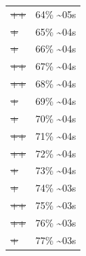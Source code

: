 \documentclass[12pt]{article}
\begin{document}
\begin{center}
\begin{tabular}{ll}
\sout{\sout{\sout{\sout{\sout{\sout{\sout{\sout{\sout{\sout{\sout{\sout{\sout{\sout{\sout{++}}}}}}}}}}}}}}} & 64\% \textasciitilde{}05s\\
\sout{\sout{\sout{\sout{\sout{\sout{\sout{\sout{\sout{\sout{\sout{\sout{\sout{\sout{\sout{\sout{+}}}}}}}}}}}}}}}} & 65\% \textasciitilde{}04s\\
\sout{\sout{\sout{\sout{\sout{\sout{\sout{\sout{\sout{\sout{\sout{\sout{\sout{\sout{\sout{\sout{+}}}}}}}}}}}}}}}} & 66\% \textasciitilde{}04s\\
\sout{\sout{\sout{\sout{\sout{\sout{\sout{\sout{\sout{\sout{\sout{\sout{\sout{\sout{\sout{\sout{++}}}}}}}}}}}}}}}} & 67\% \textasciitilde{}04s\\
\sout{\sout{\sout{\sout{\sout{\sout{\sout{\sout{\sout{\sout{\sout{\sout{\sout{\sout{\sout{\sout{++}}}}}}}}}}}}}}}} & 68\% \textasciitilde{}04s\\
\sout{\sout{\sout{\sout{\sout{\sout{\sout{\sout{\sout{\sout{\sout{\sout{\sout{\sout{\sout{\sout{\sout{+}}}}}}}}}}}}}}}}} & 69\% \textasciitilde{}04s\\
\sout{\sout{\sout{\sout{\sout{\sout{\sout{\sout{\sout{\sout{\sout{\sout{\sout{\sout{\sout{\sout{\sout{+}}}}}}}}}}}}}}}}} & 70\% \textasciitilde{}04s\\
\sout{\sout{\sout{\sout{\sout{\sout{\sout{\sout{\sout{\sout{\sout{\sout{\sout{\sout{\sout{\sout{\sout{++}}}}}}}}}}}}}}}}} & 71\% \textasciitilde{}04s\\
\sout{\sout{\sout{\sout{\sout{\sout{\sout{\sout{\sout{\sout{\sout{\sout{\sout{\sout{\sout{\sout{\sout{++}}}}}}}}}}}}}}}}} & 72\% \textasciitilde{}04s\\
\sout{\sout{\sout{\sout{\sout{\sout{\sout{\sout{\sout{\sout{\sout{\sout{\sout{\sout{\sout{\sout{\sout{\sout{+}}}}}}}}}}}}}}}}}} & 73\% \textasciitilde{}04s\\
\sout{\sout{\sout{\sout{\sout{\sout{\sout{\sout{\sout{\sout{\sout{\sout{\sout{\sout{\sout{\sout{\sout{\sout{+}}}}}}}}}}}}}}}}}} & 74\% \textasciitilde{}03s\\
\sout{\sout{\sout{\sout{\sout{\sout{\sout{\sout{\sout{\sout{\sout{\sout{\sout{\sout{\sout{\sout{\sout{\sout{++}}}}}}}}}}}}}}}}}} & 75\% \textasciitilde{}03s\\
\sout{\sout{\sout{\sout{\sout{\sout{\sout{\sout{\sout{\sout{\sout{\sout{\sout{\sout{\sout{\sout{\sout{\sout{++}}}}}}}}}}}}}}}}}} & 76\% \textasciitilde{}03s\\
\sout{\sout{\sout{\sout{\sout{\sout{\sout{\sout{\sout{\sout{\sout{\sout{\sout{\sout{\sout{\sout{\sout{\sout{\sout{+}}}}}}}}}}}}}}}}}}} & 77\% \textasciitilde{}03s\\

\end{tabular}
\end{center}
\end{document}
